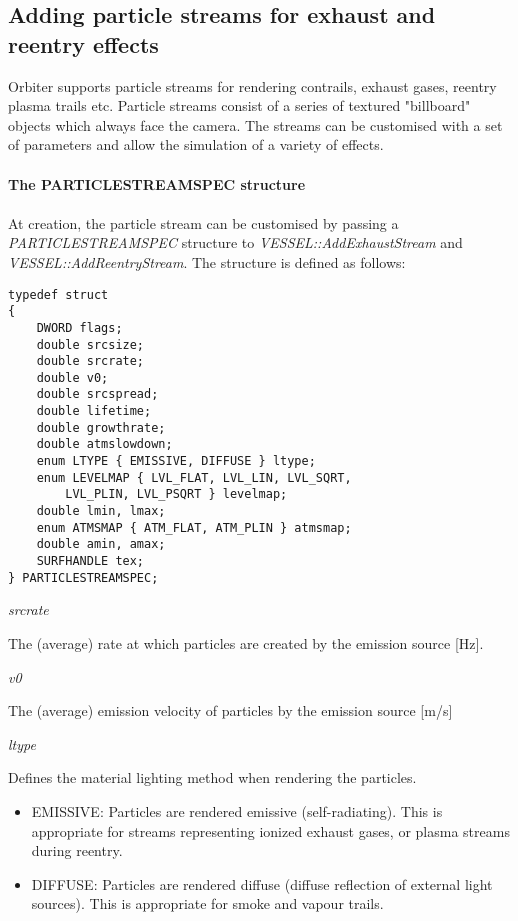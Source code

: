 \documentclass[Orbiter Developer Manual.tex]{subfiles}
\begin{document}
\subsection{Adding particle streams for exhaust and reentry effects}
Orbiter supports particle streams for rendering contrails, exhaust gases, reentry plasma trails etc. Particle streams consist of a series of textured "billboard" objects which always face the camera. The streams can be customised with a set of parameters and allow the simulation of a variety of effects.\\
\\
\textbf{The PARTICLESTREAMSPEC structure}\\
\\
At creation, the particle stream can be customised by passing a \textit{PARTICLESTREAMSPEC} structure to \textit{VESSEL::AddExhaustStream} and \textit{VESSEL::AddReentryStream}. The structure is defined as follows:

\begin{lstlisting}
typedef struct
{
	DWORD flags;
	double srcsize;
	double srcrate;
	double v0;
	double srcspread;
	double lifetime;
	double growthrate;
	double atmslowdown;
	enum LTYPE { EMISSIVE, DIFFUSE } ltype;
	enum LEVELMAP { LVL_FLAT, LVL_LIN, LVL_SQRT,
		LVL_PLIN, LVL_PSQRT } levelmap;
	double lmin, lmax;
	enum ATMSMAP { ATM_FLAT, ATM_PLIN } atmsmap;
	double amin, amax;
	SURFHANDLE tex;
} PARTICLESTREAMSPEC;
\end{lstlisting}

\noindent
\textit{srcrate}
\begin{adjustwidth}{1cm}{0cm}
The (average) rate at which particles are created by the emission source [Hz].
\\
\end{adjustwidth}


\noindent
\textit{v0}
\begin{adjustwidth}{1cm}{0cm}
The (average) emission velocity of particles by the emission source [m/s]
\\
\end{adjustwidth}

\noindent
\textit{ltype}
\begin{adjustwidth}{1cm}{0cm}
Defines the material lighting method when rendering the particles.

\begin{itemize}
\item EMISSIVE: Particles are rendered emissive (self-radiating). This is appropriate for streams representing ionized exhaust gases, or plasma streams during reentry.
\item DIFFUSE: Particles are rendered diffuse (diffuse reflection of external light sources). This is appropriate for smoke and vapour trails.
\end{itemize}
\end{adjustwidth}
\end{document}
